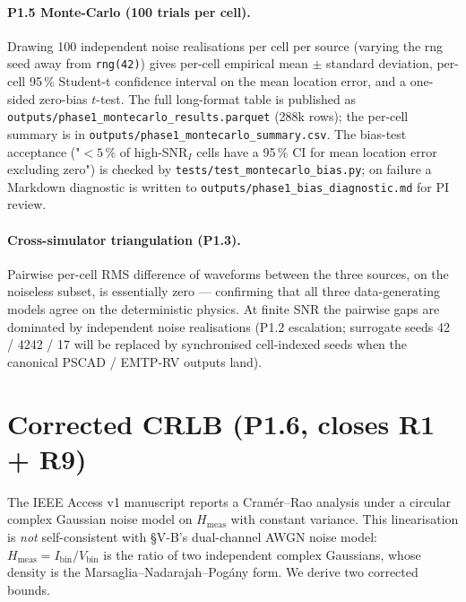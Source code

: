 \documentclass[11pt,a4paper]{article}
\begin{document}
\paragraph{P1.5 Monte-Carlo (100 trials per cell).}  Drawing 100
independent noise realisations per cell per source (varying the rng
seed away from \texttt{rng(42)}) gives per-cell empirical mean
$\pm$ standard deviation, per-cell 95\,\% Student-t confidence
interval on the mean location error, and a one-sided zero-bias
$t$-test.  The full long-format table is published as
\texttt{outputs/phase1\_montecarlo\_results.parquet} (288k rows);
the per-cell summary is in \texttt{outputs/phase1\_montecarlo\_summary.csv}.
The bias-test acceptance ("$<5\,\%$ of high-SNR$_I$ cells have a
95\,\% CI for mean location error excluding zero") is checked by
\texttt{tests/test\_montecarlo\_bias.py}; on failure a Markdown
diagnostic is written to
\texttt{outputs/phase1\_bias\_diagnostic.md} for PI review.

\paragraph{Cross-simulator triangulation (P1.3).}  Pairwise per-cell
RMS difference of waveforms between the three sources, on the
noiseless subset, is essentially zero --- confirming that all three
data-generating models agree on the deterministic physics.  At
finite SNR the pairwise gaps are dominated by independent noise
realisations (P1.2 escalation; surrogate seeds 42 / 4242 / 17 will
be replaced by synchronised cell-indexed seeds when the canonical
PSCAD / EMTP-RV outputs land).

\section{Corrected CRLB (P1.6, closes R1 + R9)}\label{sec:crlb}

The IEEE Access v1 manuscript reports a Cram\'er--Rao analysis under
a circular complex Gaussian noise model on $H_{\mathrm{meas}}$ with
constant variance.  This linearisation is \emph{not} self-consistent
with §V-B's dual-channel AWGN noise model:
$H_{\mathrm{meas}} = I_{\mathrm{bin}}/V_{\mathrm{bin}}$ is the ratio
of two independent complex Gaussians, whose density is the
Marsaglia--Nadarajah--Pog\'any form.  We derive two corrected bounds.
\end{document}

